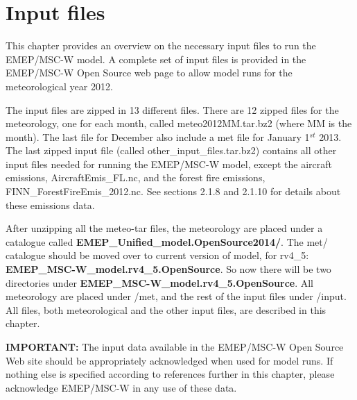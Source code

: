 \chapter{Input files}
\label{ch:InputFiles}

This chapter provides an overview on the necessary input files to run the 
EMEP/MSC-W model. A complete set of input files is provided in the EMEP/MSC-W 
Open Source web page to allow model runs for the meteorological year 2012. 

The input files are zipped in 13 different files. There are 12 zipped files 
for the meteorology, one for each month, called meteo2012MM.tar.bz2 (where MM 
is the month). 
The last file for December also include a met file for January 1$^{st}$ 2013. 
The last zipped input file (called other\_input\_files.tar.bz2) contains all 
other input files needed for running the EMEP/MSC-W model, except the aircraft emissions,
AircraftEmis\_FL.nc, and the forest fire emissions, FINN\_ForestFireEmis\_2012.nc. See sections 2.1.8 and 2.1.10 for details about these emissions data.

After unzipping all the meteo-tar files, the meteorology are placed under a
catalogue called {\bf EMEP\_Unified\_model.OpenSource2014/}. The met/
catalogue should be moved over to current version of model, for rv4\_5:
{\bf EMEP\_MSC-W\_model.rv4\_5.OpenSource}. 
So now there will be two directories under 
{\bf EMEP\_MSC-W\_model.rv4\_5.OpenSource}. 
All meteorology are placed under /met, and the rest of the input files under 
/input. 
All files, both meteorological and the other input files, are described in 
this chapter.

{\bf IMPORTANT:} The input data available in the EMEP/MSC-W Open Source Web
site should be appropriately acknowledged when used for model runs.
If nothing else is specified according to references further in this
chapter, please acknowledge EMEP/MSC-W in any use of these data.

